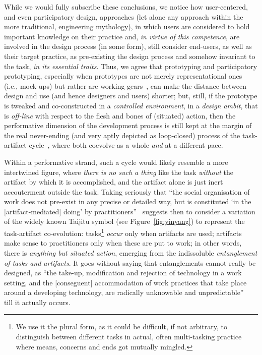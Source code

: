 \documentclass{article}
\begin{document}
While we would fully subscribe these conclusions, we notice how user-centered, and even participatory design, approaches (let alone any approach within the more traditional, engineering mythology), in which users are considered to hold important knowledge on their practice and, \emph{in virtue of this competence}, are involved in the design process (in some form), still consider end-users, as well as their target practice, as pre-existing the design process and somehow invariant to the task, \emph{in its essential traits}. Thus, we agree that prototyping and participatory prototyping, especially when prototypes are not merely representational ones (i.e., mock-ups) but rather are working gears~\citep[like in the framework presented in ][]{harel_can_2008}, can make the distance between design and use (and hence designers and users) shorter; but, still, if the prototype is tweaked and co-constructed in a \emph{controlled environment}, in a \emph{design ambit}, that is \emph{off-line} with respect to the flesh and bones of (situated) action, then the performative dimension of the development process is still kept at the margin of the real never-ending (and very aptly depicted as loop-closed) process of the task-artifact cycle~\citep{carroll_task-artifact_1991}, where both coevolve as a whole \emph{and} at a different pace. 

Within a performative strand, such a cycle would likely resemble a more intertwined figure, where \emph{there is no such a thing} like the task \emph{without} the artifact by which it is accomplished, and the artifact alone is just inert accouterment outside the task. Taking seriously that ``the social organisation of work does not pre-exist in any precise or detailed way, but is constituted `in the [artifact-mediated] doing' by practitioners''~\citep{buescher_landscapes_2001} suggests then to consider a variation of the widely known Taijitu symbol (see Figure~\ref{fig:yinyang}) to represent the task-artifact co-evolution: tasks\footnote{We use it the plural form, as it could be difficult, if not arbitrary, to distinguish between different tasks in actual, often multi-tasking practice where means, concerns and ends got mutually mingled.} \emph{occur} only when artifacts are used; artifacts make sense to practitioners only when these are put to work; in other words, there is \emph{anything but situated action}, emerging from the indissoluble \emph{entanglement of tasks and artifacts}. It goes without saying that entanglements cannot really be designed, as ``the take-up, modification and rejection of technology in a work setting, and the [conseguent] accommodation of work practices that take place around a developing technology, are radically unknowable and unpredictable''~\citep{buescher_landscapes_2001} till it actually occurs.
\end{document}
